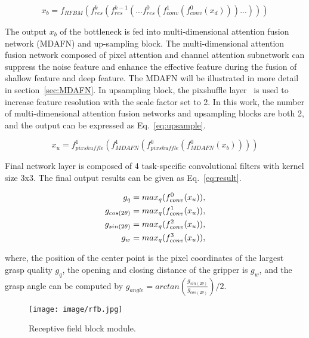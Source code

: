 \documentclass[journal]{IEEEtran}
\begin{document}
\begin{equation}
x_{b} = f_{RFBM}(f_{res}^k(f_{res}^{k-1}(...f_{res}^0(f_{conv}^{1}(f_{conv}^0(x_{d})))...)))
\label{eq:bottleneck}
\end{equation}

The output $x_b$ of the bottleneck is fed into multi-dimensional attention fusion network (MDAFN) and up-sampling block. The multi-dimensional attention fusion network composed of pixel attention and channel attention subnetwork can suppress the noise feature and enhance the effective feature during the fusion of shallow feature and deep feature. The MDAFN will be illustrated in more detail in section~\ref{sec:MDAFN}. In upsampling block, the pixshuffle layer~\cite{pixshuffle} is used to increase feature resolution with the scale factor set to 2. In this work, the number of multi-dimensional attention fusion networks and upsampling blocks are both 2, and the output can be expressed as Eq.~\ref{eq:upsample}.

\begin{equation}
x_{u} = f_{pixshuffle}^{1}(f_{MDAFN}^1(f_{pixshuffle}^0(f_{MDAFN}^0(x_{b}))))
\label{eq:upsample}
\end{equation}

Final network layer is composed of 4 task-specific convolutional filters with kernel size 3x3. The final output results can be given as Eq.~\ref{eq:result}.


\begin{equation}
\label{eq:result}
\begin{aligned}
g_q &= max_q(f_{conv}^0(x_u)),\\
g_{cos(2\theta)} &= max_q(f_{conv}^1(x_u)),\\
g_{sin(2\theta)} &= max_q(f_{conv}^2(x_u)),\\
g_w &= max_q(f_{conv}^3(x_u)),\\
\end{aligned}
\\
\end{equation}

where, the position of the center point is the pixel coordinates of the largest grasp quality $g_q$, the opening and closing distance of the gripper is $g_w$, and the grasp angle can be computed by $g_{angle} = arctan(\frac{g_{sin(2\theta)}}{g_{cos(2\theta)}}) / 2$.

\begin{figure}[t!]
{\texttt{[image: image/rfb.jpg]}}
	\caption{Receptive field block module.}
	\label{fig:rfb}
\end{figure} 
\end{document}
